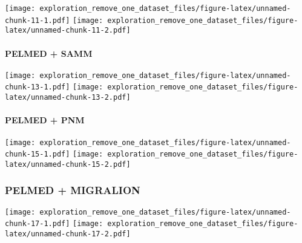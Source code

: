 \documentclass[
]{article}
\begin{document}
\texttt{[image: exploration\_remove\_one\_dataset\_files/figure-latex/unnamed-chunk-11-1.pdf]}
\texttt{[image: exploration\_remove\_one\_dataset\_files/figure-latex/unnamed-chunk-11-2.pdf]}

\hypertarget{pelmed-samm}{%
\paragraph{PELMED + SAMM}\label{pelmed-samm}}

\texttt{[image: exploration\_remove\_one\_dataset\_files/figure-latex/unnamed-chunk-13-1.pdf]}
\texttt{[image: exploration\_remove\_one\_dataset\_files/figure-latex/unnamed-chunk-13-2.pdf]}

\hypertarget{pelmed-pnm}{%
\paragraph{PELMED + PNM}\label{pelmed-pnm}}

\texttt{[image: exploration\_remove\_one\_dataset\_files/figure-latex/unnamed-chunk-15-1.pdf]}
\texttt{[image: exploration\_remove\_one\_dataset\_files/figure-latex/unnamed-chunk-15-2.pdf]}

\hypertarget{pelmed-migralion}{%
\subsubsection{PELMED + MIGRALION}\label{pelmed-migralion}}

\texttt{[image: exploration\_remove\_one\_dataset\_files/figure-latex/unnamed-chunk-17-1.pdf]}
\texttt{[image: exploration\_remove\_one\_dataset\_files/figure-latex/unnamed-chunk-17-2.pdf]}
\end{document}
